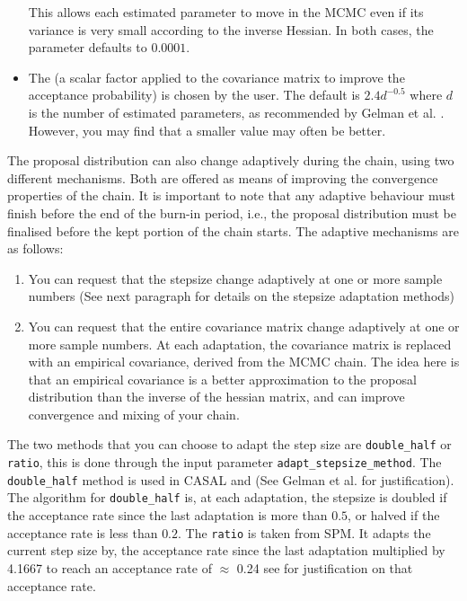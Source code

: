 \begin{itemize}
This allows each estimated parameter to move in the MCMC even if its variance is very small according to the inverse Hessian. In both cases, the  parameter defaults to $0.0001$.

\item The  (a scalar factor applied to the covariance matrix to improve the acceptance probability) is chosen by the user. The default is $2.4d^{-0.5}$ where $d$ is the number of estimated parameters, as recommended by Gelman et al. \citep{823}. However, you may find that a smaller value may often be better. 
\end{itemize}

The proposal distribution can also change adaptively during the chain, using two different mechanisms. Both are offered as means of improving the convergence properties of the chain. It is important to note that any adaptive behaviour must finish before the end of the burn-in period, i.e., the proposal distribution must be finalised before the kept portion of the chain starts. The adaptive mechanisms are as follows: 

\begin{enumerate}
\item You can request that the stepsize change adaptively at one or more sample numbers (See next paragraph for details on the stepsize adaptation methods)

\item You can request that the entire covariance matrix change adaptively at one or more sample numbers. At each adaptation, the covariance matrix is replaced with an empirical covariance, derived from the MCMC chain. The idea here is that an empirical covariance is a better approximation to the proposal distribution than the inverse of the hessian matrix, and can improve convergence and mixing of your chain.
\end{enumerate}

The two methods that you can choose to adapt the step size are \texttt{double\_half} or \texttt{ratio}, this is done through the input parameter \texttt{adapt\_stepsize\_method}. The \texttt{double\_half} method is used in CASAL and (See Gelman et al. \citep{823} for justification). The algorithm for \texttt{double\_half} is, at each adaptation, the stepsize is doubled if the acceptance rate since the last adaptation is more than $0.5$, or halved if the acceptance rate is less than $0.2$. The \texttt{ratio} is taken from SPM. It adapts the current step size by, the acceptance rate since the last adaptation multiplied by 4.1667 to reach an acceptance rate of $\approx$ 0.24 see \cite{mcmc_rate} for justification on that acceptance rate.

